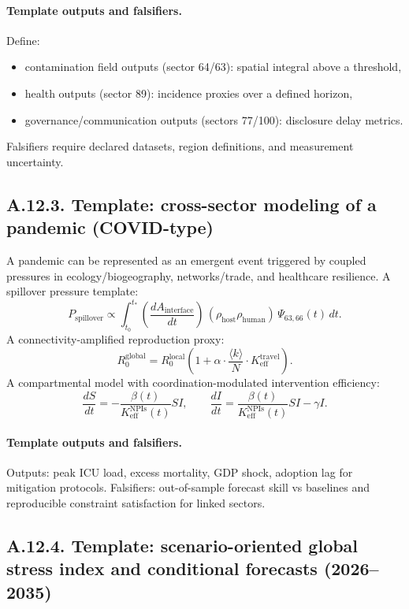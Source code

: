 \documentclass[13pt,a4paper]{article}
\begin{document}
	\paragraph{Template outputs and falsifiers.}
	Define:
	\begin{itemize}[leftmargin=*]
		\item contamination field outputs (sector 64/63): spatial integral above a threshold,
		\item health outputs (sector 89): incidence proxies over a defined horizon,
		\item governance/communication outputs (sectors 77/100): disclosure delay metrics.
	\end{itemize}
	Falsifiers require declared datasets, region definitions, and measurement uncertainty.
	
	\subsection*{A.12.3. Template: cross-sector modeling of a pandemic (COVID-type)}
	
	A pandemic can be represented as an emergent event triggered by coupled pressures in ecology/biogeography, networks/trade, and healthcare resilience. A spillover pressure template:
	$$
	P_{\mathrm{spillover}} \propto \int_{t_0}^{t_{*}}
	\left(\frac{dA_{\mathrm{interface}}}{dt}\right)\,
	\left(\rho_{\mathrm{host}}\rho_{\mathrm{human}}\right)\,
	\Psi_{63,66}(t)\,dt.
	$$
	A connectivity-amplified reproduction proxy:
	$$
	R_0^{\mathrm{global}} = R_0^{\mathrm{local}}\left(1+\alpha\cdot \frac{\langle k\rangle}{N}\cdot K_{\mathrm{eff}}^{\mathrm{travel}}\right).
	$$
	A compartmental model with coordination-modulated intervention efficiency:
	$$
	\frac{dS}{dt} = - \frac{\beta(t)}{K_{\mathrm{eff}}^{\mathrm{NPIs}}(t)}SI,\qquad
	\frac{dI}{dt} = \frac{\beta(t)}{K_{\mathrm{eff}}^{\mathrm{NPIs}}(t)}SI - \gamma I.
	$$
	
	\paragraph{Template outputs and falsifiers.}
	Outputs: peak ICU load, excess mortality, GDP shock, adoption lag for mitigation protocols.
	Falsifiers: out-of-sample forecast skill vs baselines and reproducible constraint satisfaction for linked sectors.
	
	\subsection*{A.12.4. Template: scenario-oriented global stress index and conditional forecasts (2026--2035)}
	
\end{document}
